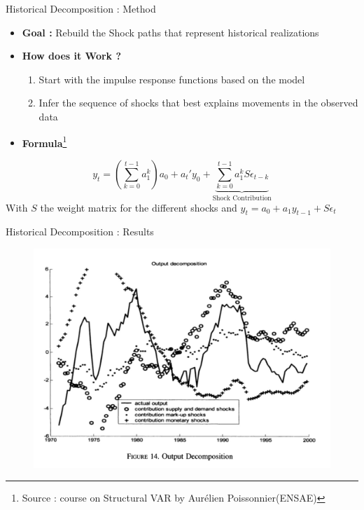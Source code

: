 \documentclass{beamer}
\begin{document}
\begin{frame}{Historical Decomposition : Method}
\vspace{-0.3cm}
\begin{itemize}
    \item \textbf{Goal :} Rebuild the Shock paths that represent historical realizations
    \item \textbf{How does it Work ?} 
    \begin{enumerate}
        \item Start with the impulse response functions based on the model
        \item Infer the sequence of shocks that best explains movements in the observed data
    \end{enumerate}
    \item \textbf{Formula}\footnote{Source : course on Structural VAR by Aurélien Poissonnier(ENSAE)}
\end{itemize}
$$y_t = (\sum_{k=0}^{t-1}a_1^k)a_0 + a_t'y_0+\underbrace{\sum_{k=0}^{t-1}a_1^kS\epsilon_{t-k}}_{\text{Shock Contribution}}$$
\small{\hspace{0.6cm}With $S$ the weight matrix for the different shocks and $y_t=a_0 + a_1y_{t-1}+S\epsilon_t$}

\end{frame}
	
\begin{frame}{Historical Decomposition : Results}
\vspace{-0.3cm}
\begin{figure}
    \centering
    \includegraphics[width=0.9\linewidth]{images/hist_decomp_Y.png}
    \label{fig:enter-label}
\end{figure}

\end{frame}
\end{document}
